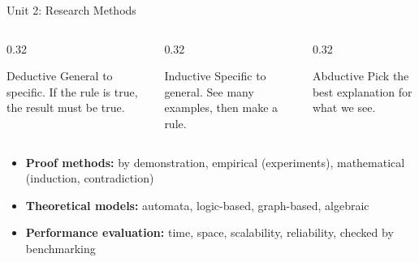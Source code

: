 \documentclass[aspectratio=169,10pt]{beamer}
\begin{document}
\begin{frame}{Unit 2: Research Methods}
\begin{columns}[T]
\begin{column}{0.32\textwidth}
\begin{block}{Deductive}
General to specific. If the rule is true, the result must be true.
\end{block}
\end{column}
\begin{column}{0.32\textwidth}
\begin{block}{Inductive}
Specific to general. See many examples, then make a rule.
\end{block}
\end{column}
\begin{column}{0.32\textwidth}
\begin{block}{Abductive}
Pick the best explanation for what we see.
\end{block}
\end{column}
\end{columns}
\bigskip
\begin{itemize}
\item \textbf{Proof methods:} by demonstration, empirical (experiments), mathematical (induction, contradiction)
\item \textbf{Theoretical models:} automata, logic-based, graph-based, algebraic
\item \textbf{Performance evaluation:} time, space, scalability, reliability, checked by benchmarking
\end{itemize}
\end{frame}
\end{document}
